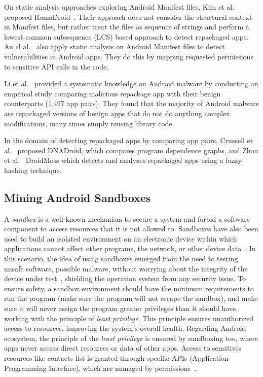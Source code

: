 On static analysis approaches exploring Android Manifest files, Kim et al. proposed RomaDroid~\cite{DBLP:journals/access/KimLCP19}.  Their approach does not consider the structural context in Manifest files, but rather treat the files as sequence of strings and perform a lowest common subsequence (LCS) based approach to detect repackaged apps. Au el al.~\cite{DBLP:conf/ccs/AuZHL12} also apply static analysis on Android Manifest files to detect vulnerabilities in Android apps. They do this by mapping requested permissions to sensitive API calls in the code.

Li et al.~\cite{DBLP:journals/tifs/0029LBKTLC17} provided a systematic knowledge on Android malware by conducting an empirical study comparing malicious repackage app with their benign counterparts (1,497 app pairs). They found that the majority of Android malware are repackaged versions of benign apps that do not do anything complex modifications, many times simply reusing library code.

In the domain of detecting repackaged apps by comparing app pairs, Crussell et al.~\cite{DBLP:conf/esorics/CrussellGC12} proposed  DNADroid, which compares program dependence graphs, and Zhou et al.~\cite{DBLP:conf/codaspy/ZhouZJN12} DroidMoss which detects and analyzes repackaged apps using a fuzzy hashing technique. 

\subsection{Mining Android Sandboxes}\label{sec:android-sandbox}

A \emph{sandbox}
is a well-known mechanism to secure a system and forbid a software component to access
resources that it is not allowed to. Sandboxes have also been used to build an isolated
environment on an electronic device within which applications cannot affect other programs, the network, or other device data~\cite{DBLP:journals/peerj-cs/MaassSCS16}. In this scenario, the idea of using sandboxes emerged from the
need to testing unsafe software, possible malware, without worrying about the integrity of the
device under test~\cite{DBLP:conf/esorics/BordoniCS17}, shielding the operation system from any security issue.
To ensure safety, a sandbox environment should have the minimum requirements to run the
program (make sure the program will not escape the sandbox), and make sure it will never
assign the program greater privileges than it should have, working with the principle of
\emph{least privilege}. This principle ensures unauthorized access to resources,
improving the system's overall health. Regarding Android ecosystem, the principle
of the \emph{least privilege} is ensured by sandboxing too,
where apps never access direct resources or data of other apps. Access to sensitives resources
like contacts list is granted through specific APIs (Application Programming Interface),
which are managed by permissions~\cite{DBLP:journals/corr/abs-2109-06613}. 

